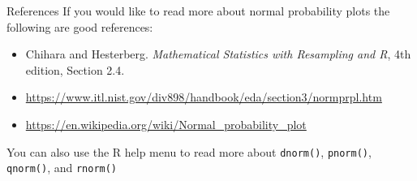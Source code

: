 \documentclass[10pt]{beamer}
\begin{document}

\begin{frame}{References}
If you would like to read more about normal probability plots the following are good references:
\begin{itemize}
\item Chihara and Hesterberg. \emph{Mathematical Statistics with Resampling and R}, 4th edition, Section 2.4.
\item \url{https://www.itl.nist.gov/div898/handbook/eda/section3/normprpl.htm}
\item \url{https://en.wikipedia.org/wiki/Normal_probability_plot}\\
\end{itemize}
\vspace{10pt}

You can also use the R help menu to read more about \texttt{dnorm()}, \texttt{pnorm()}, \texttt{qnorm()}, and \texttt{rnorm()}
\end{frame}
\end{document}
